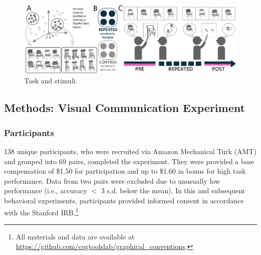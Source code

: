 \documentclass[10pt,letterpaper]{article}
\begin{document}

\begin{figure}
\includegraphics[width=\linewidth]{figures/task_stimuli.pdf}
\caption{Task and stimuli. } 
\label{task_stimuli}
\end{figure}

\subsection{Methods: Visual Communication Experiment}

\subsubsection{Participants} 138 unique participants, who were recruited via Amazon Mechanical Turk (AMT) and grouped into 69 pairs, completed the experiment.
They were provided a base compensation of \$1.50 for participation and up to \$1.60 in bonus for high task performance.
Data from two pairs were excluded due to unusually low performance (i.e., accuracy $<$ 3 s.d. below the mean).
In this and subsequent behavioral experiments, participants provided informed consent in accordance with the Stanford IRB.\footnote{All materials and data are available at \url{https://github.com/cogtoolslab/graphical_conventions}.}
\end{document}
